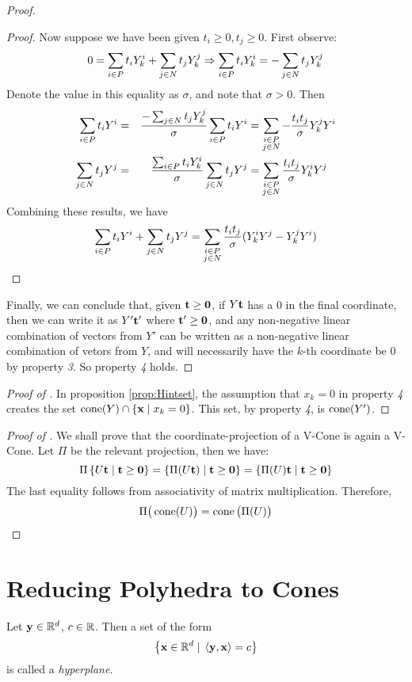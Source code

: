 \begin{proof}
\begin{proof}
Now suppose we have been given $t_i \geq 0, t_j \geq 0$.  First observe:
\[ 0 = \sum_{i\in P} t_iY^i_{k} + \sum_{j\in N} t_jY^j_{k} \Rightarrow \sum_{i\in P} t_iY^i_{k} = -\sum_{j\in N} t_jY^j_{k}\]
Denote the value in this equality as $\sigma$, and note that $\sigma > 0$.  Then
\begin{alignat*}{3} 
\sum_{i\in P} t_i Y^i &= &\frac{-\sum_{j\in N} t_j Y^j_{k}}{\sigma}\sum_{i\in P} t_i Y^i &= 
                     \sum_{\substack{i\in P \\ j\in N}} -\frac{t_i t_j}{\sigma}Y^j_{k} Y^i \\
\sum_{j\in N} t_j Y^j &= &\frac{\sum_{i\in P} t_i Y^i_{k}}{\sigma}\sum_{j\in N} t_j Y^j &= 
                     \sum_{\substack{i\in P \\ j\in N}} \frac{t_i t_j}{\sigma}Y^i_{k} Y^j
\end{alignat*}
Combining these results, we have
\[ \sum_{i\in P} t_i Y^i + \sum_{j\in N} t_j Y^j = 
                     \sum_{\substack{i\in P \\ j\in N}} \frac{t_i t_j}{\sigma}(Y^i_{k} Y^j - Y^j_{k} Y^i) \]
\end{proof}
Finally, we can conclude that, given $\mathbf{t} \geq \mathbf{0}$, if $ Y\mathbf{t}$ has a $0$ in the final coordinate, then we can write it as $ Y'\mathbf{t}'$ where $\mathbf{t}' \geq \mathbf{0}$, and any non-negative linear combination of vectors from $Y'$ can be written as a non-negative linear combination of vetors from $Y$, and will necessarily have the $k$-th coordinate be $0$ by property \textit{3}.  So property \textit{4} holds.
\end{proof}

\begin{proof}[Proof of {\Hint}]
In proposition \ref{prop:Hintset}, the assumption that $x_k = 0$ in property \textit{4} creates the set $\operatorname{cone}(Y) \cap \left\{\mathbf{x} \;|\; x_k = 0\right\}$.  This set, by property \textit{4}, is $\operatorname{cone}(Y')$.
\end{proof}

\begin{proof}[Proof of {\Hproj}]
  We shall prove that the coordinate-projection of a V-Cone is again a V-Cone.  Let $\Pi$ be the relevant projection, then we have:
  \[ \Pi\left\{U\mathbf{t} \;|\; \mathbf{t} \geq \mathbf{0}\right\} = \left\{\Pi(U\mathbf{t}) \;|\; \mathbf{t} \geq \mathbf{0}\right\} = 
        \left\{\Pi(U)\mathbf{t} \;|\; \mathbf{t} \geq \mathbf{0}\right\} \]
The last equality follows from associativity of matrix multiplication.  Therefore,
  \[ \Pi\big(\operatorname{cone}(U)\big) = \operatorname{cone}\big(\Pi(U)\big) \]
\end{proof}

\section{Reducing Polyhedra to Cones}

\begin{Def}[Hyperplane]
  Let $\mathbf{y} \in \mathbb{R}^d$, $c \in \mathbb{R}$.  Then a set of the form
  \[ \left\{\mathbf{x} \in \mathbb{R}^d \;|\; \left\langle \mathbf{y}, \mathbf{x} \right\rangle = c\right\} \]
  is called a \em{hyperplane}.
\end{Def}


